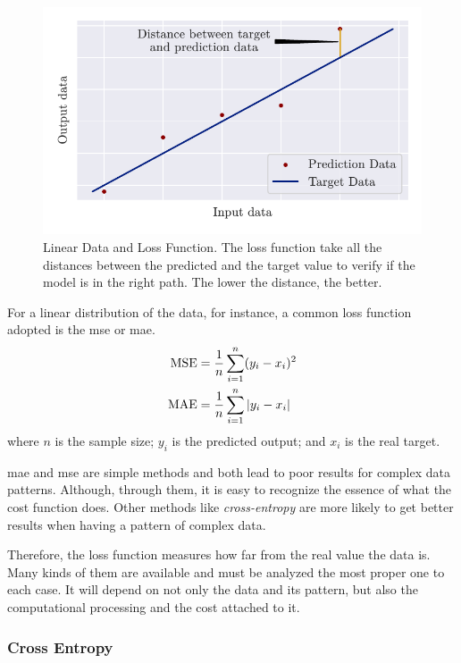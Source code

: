 \begin{figure}[!htb]
    \centering
    \includegraphics{figures/3review/nn/mae_chart.pdf}
    \caption[Linear Data and Loss Function]{Linear Data and Loss Function. The loss function take all the distances between the predicted and the target value to verify if the model is in the right path. The lower the distance, the better.}
    \label{fig:mae_chart}
\end{figure}

For a linear distribution of the data, for instance, a common loss function adopted is the \gls*{mse} \citep{bussab2017} or \gls*{mae}.
%
\begin{align}
    \text{MSE} &= \frac{1}{n} \sum_{i=1}^n (y_i - x_i)^2
    \label{eq:mse} \\
    \text{MAE} &= \frac{1}{n} \sum_{i=1}^n |y_i - x_i|
    \label{eq:mae}
\end{align}
%
where \(n\) is the sample size; \(y_i\) is the predicted output; and \(x_i\) is the real target.

\gls*{mae} and \gls*{mse} are simple methods and both lead to poor results for complex data patterns.
Although, through them, it is easy to recognize the essence of what the cost function does. 
Other methods like \emph{cross-entropy} are more likely to get better results when having a pattern of complex data.

Therefore, the loss function measures how far from the real value the data is. Many kinds of them are available and must be analyzed the most proper one to each case. 
It will depend on not only the data and its pattern, but also the computational processing and the cost attached to it.

\subsubsection*{Cross Entropy}

